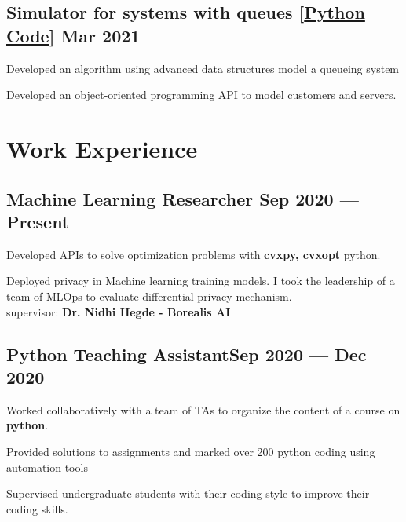 \documentclass[letter,11pt]{article}
\begin{document}
\subsection{Simulator for systems with queues [\href{https://github.com/Hadi2525/queueing_theory}{Python Code}] \hfill Mar 2021}
\begin{zitemize}
	\item Developed an algorithm using advanced data structures model a queueing system
	\item Developed an object-oriented programming API to model customers and servers.
\end{zitemize}

\section{Work Experience}
\subsection{{Machine Learning Researcher \hfill Sep 2020 --- Present}}
\begin{zitemize}
	\item Developed APIs to solve optimization problems with \textbf{cvxpy, cvxopt} python.\\
	\item Deployed privacy in Machine learning training models. I took the leadership of a team of MLOps to evaluate differential privacy mechanism.\\
	supervisor: \textbf{Dr. Nidhi Hegde - Borealis AI}
	\end{zitemize}

\subsection{{Python Teaching Assistant\hfill Sep 2020 --- Dec 2020}}
\begin{zitemize}
	\item Worked collaboratively with a team of TAs to organize the content of a course on \textbf{python}.
	\item Provided solutions to assignments and marked over 200 python coding  using automation tools
	\item Supervised undergraduate students with their coding style to improve their coding skills.
\end{zitemize}
\end{document}
